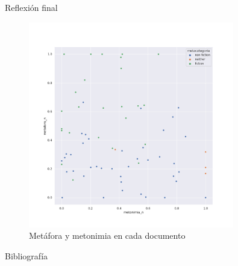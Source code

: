 \documentclass[presentation]{beamer}
\begin{document}
\begin{frame}[label={sec:org71fc4f3}]{Reflexión final}
\begin{figure}
\includegraphics[width=0.8\textwidth]{./assets/literariedad_scatter.png}
\caption{Metáfora y metonimia en cada documento}
\end{figure}
\end{frame}

\begin{frame}[label={sec:org6383e79}]{Bibliografía}


\end{frame}
\end{document}
